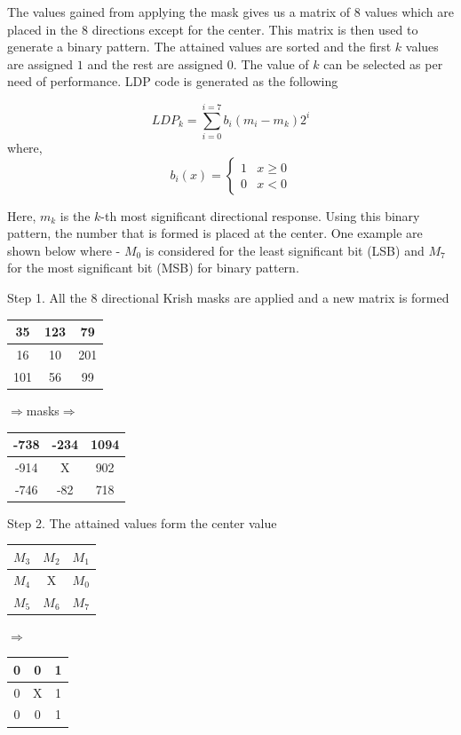 \documentclass[conference]{IEEEtran}
\begin{document}
The values gained from applying the mask gives us a matrix of 8 values which are placed in the 8 directions except for the center. This matrix is then used to generate a binary pattern. The attained values are sorted and the first $k$ values are assigned $1$ and the rest are assigned $0$. The value of $k$ can be selected as per need of performance. LDP code is generated as the following

\begin{equation}
LDP_{k}=\sum_{i=0}^{i=7} b_i(m_i - m_k)2^i
\end{equation}
where,
\begin{equation}
b_i(x)=
\begin{cases}
1 & x \ge 0\\
0 & x < 0
\end{cases}
\end{equation}

Here, $m_k$ is the $k$-th most significant directional response. Using this binary pattern, the number that is formed is placed at the center. One example are shown below where - $M_0$ is considered for the least significant bit (LSB) and $M_7$ for the most significant bit (MSB) for binary pattern.

Step 1. All the 8 directional Krish masks are applied and a new matrix is formed\\

\begin{center}
	\begin{tabular}{|c|c|c|}
		\hline
		35 & 123 & 79 \\
		\hline
		16 & 10 & 201 \\
		\hline
		101 & 56 & 99 \\
		\hline
	\end{tabular}
	$\Longrightarrow$masks$\Longrightarrow$
	\begin{tabular}{|c|c|c|}
		\hline
		-738 & -234 & 1094 \\
		\hline
		-914 & X & 902 \\
		\hline
		-746 & -82 & 718 \\
		\hline
	\end{tabular}
\end{center}

Step 2. The attained values form the center value\\

\begin{center}
	\begin{tabular}{|c|c|c|}
		\hline
		$M_3$ & $M_2$ & $M_1$ \\
		\hline
		$M_4$ & X & $M_0$ \\
		\hline
		$M_5$ & $M_6$ & $M_7$ \\
		\hline
	\end{tabular}
	$\Longrightarrow$
	\begin{tabular}{|c|c|c|}
		\hline
		0 & 0 & 1 \\
		\hline
		0 & X & 1 \\
		\hline
		0 & 0 & 1 \\
		\hline
	\end{tabular}
\end{center}
\end{document}
